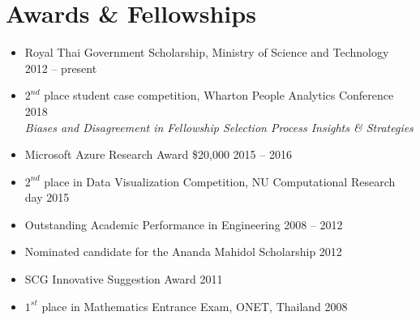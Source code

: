 \section{\sc Awards \& Fellowships}

\begin{itemize}[leftmargin=0cm, label={}]
\itemsep0em

\item Royal Thai Government Scholarship, Ministry of Science and Technology \hfill 2012 -- present

\item $2^{nd}$ place student case competition, Wharton People Analytics Conference \hfill 2018\\
{\em Biases and Disagreement in Fellowship Selection Process Insights \& Strategies}

\item Microsoft Azure Research Award \$20,000 \hfill 2015 -- 2016

\item $2^{nd}$ place in Data Visualization Competition, NU Computational Research day \hfill 2015

\item Outstanding Academic Performance in Engineering	\hfill 2008 -- 2012

\item Nominated candidate for the Ananda Mahidol Scholarship \hfill 2012

\item SCG Innovative Suggestion Award	\hfill 2011

\item $1^{st}$ place in Mathematics Entrance Exam, ONET, Thailand \hfill 2008\\

\end{itemize}
